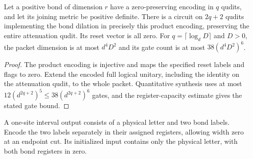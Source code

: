 \begin{lemma}
    \label{thm:mpu_compatible_bond_dilation}
    \leanok
    Let a positive bond of dimension $r$ have a zero-preserving
    encoding in $q$ qudits, and let its joining metric be positive
    definite. There is a circuit on $2q+2$ qudits implementing
    the bond dilation in precisely this product encoding, preserving
    the entire attenuation qudit. Its reset vector is all zero.
    For $q=\lceil\log_dD\rceil$ and $D>0$, the packet dimension is
    at most $d^4D^2$ and its gate count is at most $38(d^4D^2)^6$.
\end{lemma}
\begin{proof}\leanok
    The product encoding is injective and maps the specified reset
    labels and flags to zero. Extend the encoded full logical unitary,
    including the identity on the attenuation qudit, to the whole
    packet. Quantitative synthesis uses at most
    $12(d^{2q+2})^5\leq38(d^{2q+2})^6$ gates, and the register-capacity
    estimate gives the stated gate bound.
\end{proof}

\begin{definition}
    \label{def:mpu_clean_leaf_encoding}
    \leanok
    A one-site interval output consists of a physical letter and
    two bond labels. Encode the two labels separately in their
    assigned registers, allowing width zero at an endpoint cut. Its initialized input contains only
    the physical letter, with both bond registers in zero.
\end{definition}

